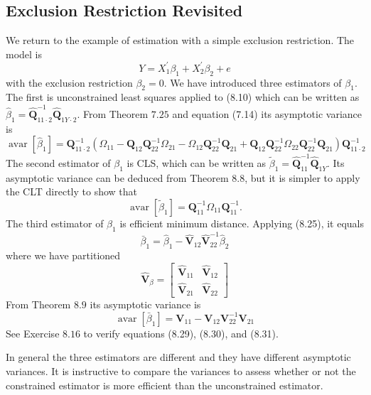 \documentclass[10pt]{article}
\begin{document}
\subsection{Exclusion Restriction Revisited}
We return to the example of estimation with a simple exclusion restriction. The model is
$$
Y=X_{1}^{\prime} \beta_{1}+X_{2}^{\prime} \beta_{2}+e
$$
with the exclusion restriction $\beta_{2}=0$. We have introduced three estimators of $\beta_{1}$. The first is unconstrained least squares applied to (8.10) which can be written as $\widehat{\beta}_{1}=\widehat{\boldsymbol{Q}}_{11 \cdot 2}^{-1} \widehat{\boldsymbol{Q}}_{1 Y \cdot 2}$. From Theorem $7.25$ and equation (7.14) its asymptotic variance is
$$
\operatorname{avar}\left[\widehat{\beta}_{1}\right]=\boldsymbol{Q}_{11 \cdot 2}^{-1}\left(\Omega_{11}-\boldsymbol{Q}_{12} \boldsymbol{Q}_{22}^{-1} \Omega_{21}-\Omega_{12} \boldsymbol{Q}_{22}^{-1} \boldsymbol{Q}_{21}+\boldsymbol{Q}_{12} \boldsymbol{Q}_{22}^{-1} \Omega_{22} \boldsymbol{Q}_{22}^{-1} \boldsymbol{Q}_{21}\right) \boldsymbol{Q}_{11 \cdot 2}^{-1}
$$
The second estimator of $\beta_{1}$ is CLS, which can be written as $\widetilde{\beta}_{1}=\widehat{\boldsymbol{Q}}_{11}^{-1} \widehat{\boldsymbol{Q}}_{1 Y}$. Its asymptotic variance can be deduced from Theorem 8.8, but it is simpler to apply the CLT directly to show that
$$
\operatorname{avar}\left[\widetilde{\beta}_{1}\right]=\boldsymbol{Q}_{11}^{-1} \Omega_{11} \boldsymbol{Q}_{11}^{-1} .
$$
The third estimator of $\beta_{1}$ is efficient minimum distance. Applying (8.25), it equals
$$
\bar{\beta}_{1}=\widehat{\beta}_{1}-\widehat{\boldsymbol{V}}_{12} \widehat{\boldsymbol{V}}_{22}^{-1} \widehat{\beta}_{2}
$$
where we have partitioned
$$
\widehat{\boldsymbol{V}}_{\beta}=\left[\begin{array}{ll}
\widehat{\boldsymbol{V}}_{11} & \widehat{\boldsymbol{V}}_{12} \\
\widehat{\boldsymbol{V}}_{21} & \widehat{\boldsymbol{V}}_{22}
\end{array}\right]
$$
From Theorem $8.9$ its asymptotic variance is
$$
\operatorname{avar}\left[\bar{\beta}_{1}\right]=\boldsymbol{V}_{11}-\boldsymbol{V}_{12} \boldsymbol{V}_{22}^{-1} \boldsymbol{V}_{21}
$$
See Exercise $8.16$ to verify equations (8.29), (8.30), and (8.31).

In general the three estimators are different and they have different asymptotic variances. It is instructive to compare the variances to assess whether or not the constrained estimator is more efficient than the unconstrained estimator.
\end{document}
